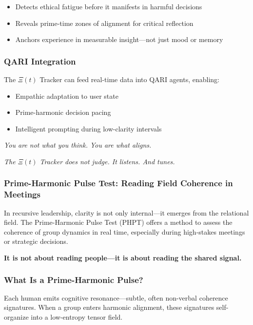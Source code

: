 \documentclass[12pt]{article}
\begin{document}
\begin{itemize}
    \item Detects ethical fatigue before it manifests in harmful decisions
    \item Reveals prime-time zones of alignment for critical reflection
    \item Anchors experience in measurable insight—not just mood or memory
\end{itemize}

\subsubsection*{QARI Integration}

The $\Xi(t)$ Tracker can feed real-time data into QARI agents, enabling:

\begin{itemize}
    \item Empathic adaptation to user state
    \item Prime-harmonic decision pacing
    \item Intelligent prompting during low-clarity intervals
\end{itemize}

\textit{You are not what you think. You are what aligns.}

\textit{The $\Xi(t)$ Tracker does not judge. It listens. And tunes.}

\subsubsection*{Prime-Harmonic Pulse Test: Reading Field Coherence in Meetings}

In recursive leadership, clarity is not only internal—it emerges from the relational field. The Prime-Harmonic Pulse Test (PHPT) offers a method to assess the coherence of group dynamics in real time, especially during high-stakes meetings or strategic decisions.

\textbf{It is not about reading people—it is about reading the shared signal.}

\subsubsection*{What Is a Prime-Harmonic Pulse?}

Each human emits cognitive resonance—subtle, often non-verbal coherence signatures. When a group enters harmonic alignment, these signatures self-organize into a low-entropy tensor field.
\end{document}
